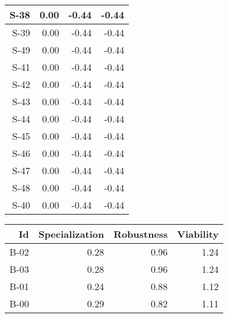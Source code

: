 \begin{tabular}{ | r | r | r | r | }
    \hline
                  S-38  &            0.00  &           -0.44  &           -0.44  \\
    \hline
                  S-39  &            0.00  &           -0.44  &           -0.44  \\
    \hline
                  S-49  &            0.00  &           -0.44  &           -0.44  \\
    \hline
                  S-41  &            0.00  &           -0.44  &           -0.44  \\
    \hline
                  S-42  &            0.00  &           -0.44  &           -0.44  \\
    \hline
                  S-43  &            0.00  &           -0.44  &           -0.44  \\
    \hline
                  S-44  &            0.00  &           -0.44  &           -0.44  \\
    \hline
                  S-45  &            0.00  &           -0.44  &           -0.44  \\
    \hline
                  S-46  &            0.00  &           -0.44  &           -0.44  \\
    \hline
                  S-47  &            0.00  &           -0.44  &           -0.44  \\
    \hline
                  S-48  &            0.00  &           -0.44  &           -0.44  \\
    \hline
                  S-40  &            0.00  &           -0.44  &           -0.44  \\
    \hline
\end{tabular}


\begin{tabular}{ | r | r | r | r | }
    \hline
                    Id  &  Specialization  &      Robustness  &       Viability  \\
    \hline
    \hline
                  B-02  &            0.28  &            0.96  &            1.24  \\
    \hline
                  B-03  &            0.28  &            0.96  &            1.24  \\
    \hline
                  B-01  &            0.24  &            0.88  &            1.12  \\
    \hline
                  B-00  &            0.29  &            0.82  &            1.11  \\
    \hline
\end{tabular}


